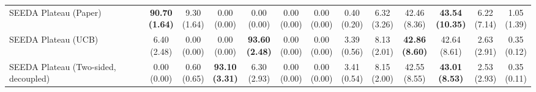 \begin{table}[H]
{\begin{tabular}{l|cccccc|cccccc}
SEEDA Plateau (Paper) & \bfseries \makecell{90.70 \\ (1.64)} & \makecell{9.30 \\ (1.64)} & {\cellcolor[HTML]{C8E6C9}} \makecell{0.00 \\ (0.00)} & \makecell{0.00 \\ (0.00)} & \makecell{0.00 \\ (0.00)} & \makecell{0.00 \\ (0.00)} & \makecell{0.40 \\ (0.20)} & \makecell{6.32 \\ (3.26)} & {\cellcolor[HTML]{C8E6C9}} \makecell{42.46 \\ (8.36)} & \bfseries \makecell{43.54 \\ (10.35)} & \makecell{6.22 \\ (7.14)} & \makecell{1.05 \\ (1.39)} \\
SEEDA Plateau (UCB) & \makecell{6.40 \\ (2.48)} & \makecell{0.00 \\ (0.00)} & {\cellcolor[HTML]{C8E6C9}} \makecell{0.00 \\ (0.00)} & \bfseries \makecell{93.60 \\ (2.48)} & \makecell{0.00 \\ (0.00)} & \makecell{0.00 \\ (0.00)} & \makecell{3.39 \\ (0.56)} & \makecell{8.13 \\ (2.01)} & {\cellcolor[HTML]{C8E6C9}} \bfseries \makecell{42.86 \\ (8.60)} & \makecell{42.64 \\ (8.61)} & \makecell{2.63 \\ (2.91)} & \makecell{0.35 \\ (0.12)} \\
SEEDA Plateau (Two-sided, decoupled) & \makecell{0.00 \\ (0.00)} & \makecell{0.60 \\ (0.65)} & {\cellcolor[HTML]{C8E6C9}} \bfseries \makecell{93.10 \\ (3.31)} & \makecell{6.30 \\ (2.93)} & \makecell{0.00 \\ (0.00)} & \makecell{0.00 \\ (0.00)} & \makecell{3.41 \\ (0.54)} & \makecell{8.15 \\ (2.00)} & {\cellcolor[HTML]{C8E6C9}} \makecell{42.55 \\ (8.55)} & \bfseries \makecell{43.01 \\ (8.53)} & \makecell{2.53 \\ (2.93)} & \makecell{0.35 \\ (0.11)} \\

\end{tabular}}
\end{table}
